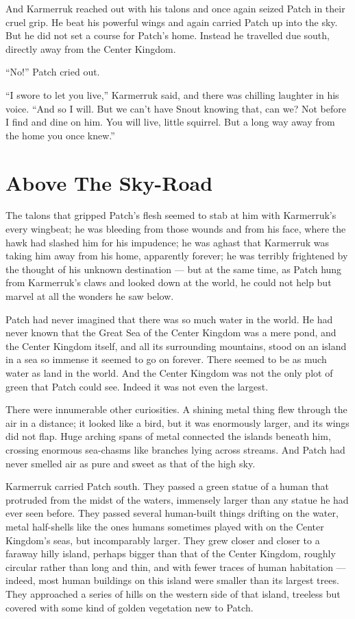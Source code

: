 \documentclass[ebook,oneside,openany,17pt]{memoir}
\renewcommand{\thechapter}{\Roman{chapter}}
\newcounter{sections}
\newcommand{\sections}[1]{%
  \section*{#1}
  \addtocounter{sections}{1}%
  \pdfbookmark[1]{#1}{section.\thechapter.\thesections}}
\begin{document}
And Karmerruk reached out with his talons and once again seized Patch
in their cruel grip. He beat his powerful wings and again carried
Patch up into the sky. But he did not set a course for Patch’s
home. Instead he travelled due south, directly away from the Center
Kingdom.

“No!” Patch cried out.

“I swore to let you live,” Karmerruk said, and there was chilling
laughter in his voice. “And so I will. But we can’t have Snout knowing
that, can we? Not before I find and dine on him. You will live, little
squirrel. But a long way away from the home you once knew.”


\sections{Above The Sky-Road}

The talons that gripped Patch’s flesh seemed to stab at him with
Karmerruk’s every wingbeat; he was bleeding from those wounds and from
his face, where the hawk had slashed him for his impudence; he was
aghast that Karmerruk was taking him away from his home, apparently
forever; he was terribly frightened by the thought of his unknown
destination — but at the same time, as Patch hung from Karmerruk’s
claws and looked down at the world, he could not help but marvel at
all the wonders he saw below.

Patch had never imagined that there was so much water in the world. He
had never known that the Great Sea of the Center Kingdom was a mere
pond, and the Center Kingdom itself, and all its surrounding
mountains, stood on an island in a sea so immense it seemed to go on
forever. There seemed to be as much water as land in the world. And
the Center Kingdom was not the only plot of green that Patch could
see. Indeed it was not even the largest.

There were innumerable other curiosities. A shining metal thing flew
through the air in a distance; it looked like a bird, but it was
enormously larger, and its wings did not flap. Huge arching spans of
metal connected the islands beneath him, crossing enormous sea-chasms
like branches lying across streams. And Patch had never smelled air as
pure and sweet as that of the high sky.

Karmerruk carried Patch south. They passed a green statue of a human
that protruded from the midst of the waters, immensely larger than any
statue he had ever seen before. They passed several human-built things
drifting on the water, metal half-shells like the ones humans
sometimes played with on the Center Kingdom’s seas, but incomparably
larger. They grew closer and closer to a faraway hilly island, perhaps
bigger than that of the Center Kingdom, roughly circular rather than
long and thin, and with fewer traces of human habitation — indeed,
most human buildings on this island were smaller than its largest
trees. They approached a series of hills on the western side of that
island, treeless but covered with some kind of golden vegetation new
to Patch.
\end{document}

